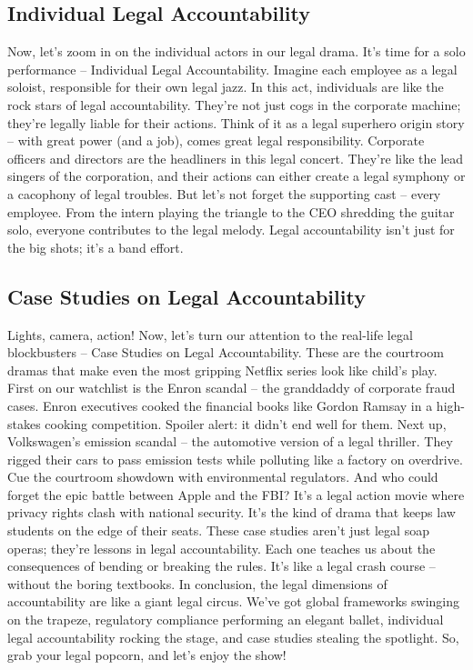 \documentclass[
  letterpaper,
  DIV=11,
  numbers=noendperiod]{scrreprt}
\begin{document}
\subsection{Individual Legal
Accountability}\label{individual-legal-accountability}

Now, let's zoom in on the individual actors in our legal drama. It's
time for a solo performance -- Individual Legal Accountability. Imagine
each employee as a legal soloist, responsible for their own legal jazz.
In this act, individuals are like the rock stars of legal
accountability. They're not just cogs in the corporate machine; they're
legally liable for their actions. Think of it as a legal superhero
origin story -- with great power (and a job), comes great legal
responsibility. Corporate officers and directors are the headliners in
this legal concert. They're like the lead singers of the corporation,
and their actions can either create a legal symphony or a cacophony of
legal troubles. But let's not forget the supporting cast -- every
employee. From the intern playing the triangle to the CEO shredding the
guitar solo, everyone contributes to the legal melody. Legal
accountability isn't just for the big shots; it's a band effort.

\subsection{Case Studies on Legal
Accountability}\label{case-studies-on-legal-accountability}

Lights, camera, action! Now, let's turn our attention to the real-life
legal blockbusters -- Case Studies on Legal Accountability. These are
the courtroom dramas that make even the most gripping Netflix series
look like child's play. First on our watchlist is the Enron scandal --
the granddaddy of corporate fraud cases. Enron executives cooked the
financial books like Gordon Ramsay in a high-stakes cooking competition.
Spoiler alert: it didn't end well for them. Next up, Volkswagen's
emission scandal -- the automotive version of a legal thriller. They
rigged their cars to pass emission tests while polluting like a factory
on overdrive. Cue the courtroom showdown with environmental regulators.
And who could forget the epic battle between Apple and the FBI? It's a
legal action movie where privacy rights clash with national security.
It's the kind of drama that keeps law students on the edge of their
seats. These case studies aren't just legal soap operas; they're lessons
in legal accountability. Each one teaches us about the consequences of
bending or breaking the rules. It's like a legal crash course -- without
the boring textbooks. In conclusion, the legal dimensions of
accountability are like a giant legal circus. We've got global
frameworks swinging on the trapeze, regulatory compliance performing an
elegant ballet, individual legal accountability rocking the stage, and
case studies stealing the spotlight. So, grab your legal popcorn, and
let's enjoy the show!
\end{document}
